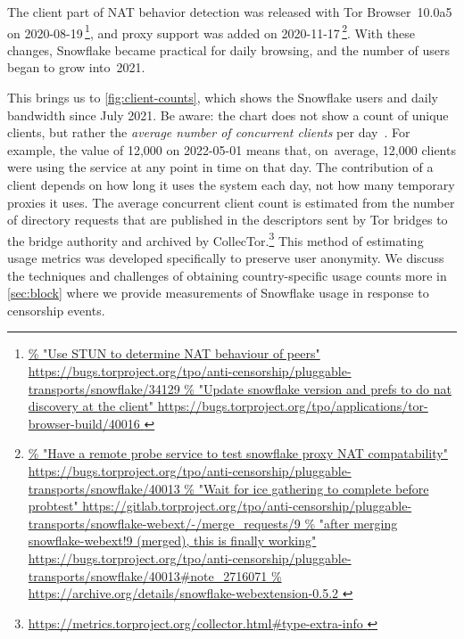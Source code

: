 \documentclass[letterpaper,twocolumn]{article}
\newlength{\urlfootnotesize}
\newcommand{\urlfootnote}[1]{\footnote{
\raggedright\fontsize{\urlfootnotesize}{\urlfootnotesize}\selectfont\url{#1}
}}
\begin{document}
The client part of NAT behavior detection
was released with Tor Browser~10.0a5 on \mbox{2020-08-19}\,\urlfootnote{
https://bugs.torproject.org/tpo/anti-censorship/pluggable-transports/snowflake/34129
},
and proxy support was added on \mbox{2020-11-17}\,\urlfootnote{
https://bugs.torproject.org/tpo/anti-censorship/pluggable-transports/snowflake/40013
}.
With these changes, Snowflake became practical for daily browsing,
and the number of users began to grow into~2021.

This brings us to \autoref{fig:client-counts}, which
shows the Snowflake users and daily bandwidth since July 2021.
Be aware: the chart does not show a count of unique clients,
but rather the \emph{average number of concurrent clients} per day~\cite{tor-tr-2012-10-001}.
For example, the value of 12,000 on \mbox{2022-05-01}
means that, on~average, 12,000 clients were using the service
at any point in time on that day.
The contribution of a client depends on how long it uses the system each day,
not how many temporary proxies it uses. The average concurrent client count is
estimated from the number of directory requests that are published in the descriptors
sent by Tor bridges to the bridge authority and archived by CollecTor.\urlfootnote{
https://metrics.torproject.org/collector.html\#type-extra-info
}
This method of estimating usage metrics was developed specifically to
preserve user anonymity. We discuss the techniques and challenges of
obtaining country-specific usage counts more in \autoref{sec:block} where we provide measurements
of Snowflake usage in response to censorship events.
\end{document}
